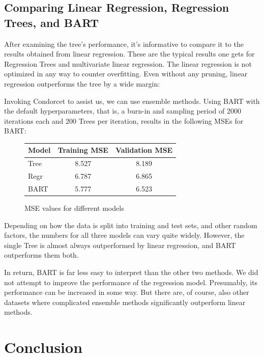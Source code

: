 \documentclass[12pt]{article}
\begin{document}
\subsection{Comparing Linear Regression, Regression Trees, and BART}

After examining the tree's performance, it's informative to compare it to the results obtained from linear regression. These are the typical results one gets for Regression Trees and multivariate linear regression. The linear regression is not optimized in any way to counter overfitting. Even without any pruning, linear regression outperforms the tree by a wide margin:

Invoking Condorcet to assist us, we can use ensemble methods. Using BART with the default hyperparameters, that is, a burn-in and sampling period of 2000 iterations each and 200 Trees per iteration, results in the following MSEs for BART:

\begin{figure}
    \centering
    \begin{tabular}{| l | c | c |}
        \hline
        Model & Training MSE & Validation MSE \\
        \hline
        Tree  & 8.527        & 8.189          \\
        Regr  & 6.787        & 6.865          \\
        BART  & 5.777        & 6.523          \\
        \hline
    \end{tabular}
    \caption{MSE values for different models}
\end{figure}

Depending on how the data is split into training and test sets, and other random factors, the numbers for all three models can vary quite widely. However, the single Tree is almost always outperformed by linear regression, and BART outperforms them both.

In return, BART is far less easy to interpret than the other two methods. We did not attempt to improve the performance of the regression model. Presumably, its performance can be increased in some way. But there are, of course, also other datasets where complicated ensemble methods significantly outperform linear methods.





\section{Conclusion}
\end{document}
